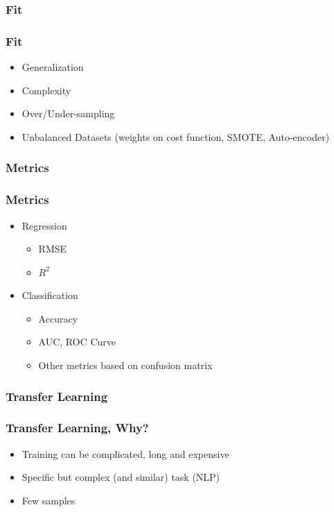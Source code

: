 \subsubsection{Fit}

\begin{frame}\frametitle{Fit}
   \begin{itemize}
      \item Generalization
      \item Complexity
      \item Over/Under-sampling
      \item Unbalanced Datasets (weights on cost function, SMOTE, Auto-encoder)
   \end{itemize}
\end{frame}


\subsubsection{Metrics}

\begin{frame}\frametitle{Metrics}
   \begin{itemize}
      \item Regression
      \begin{itemize}
         \item RMSE
         \item $R^2$
      \end{itemize}

      \item Classification
      \begin{itemize}
         \item Accuracy
         \item AUC, ROC Curve
         \item Other metrics based on confusion matrix
      \end{itemize}
   \end{itemize}
\end{frame}


\subsubsection{Transfer Learning}

\begin{frame}\frametitle{Transfer Learning, Why?}
   \begin{itemize}
      \item Training can be complicated, long and expensive
      \item Specific but complex (and similar) task (NLP)
      \item Few samples
   \end{itemize}
\end{frame}

